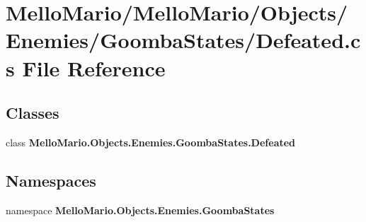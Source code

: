 \section{Mello\+Mario/\+Mello\+Mario/\+Objects/\+Enemies/\+Goomba\+States/\+Defeated.cs File Reference}
\label{GoombaStates_2Defeated_8cs}
\subsection*{Classes}
\begin{DoxyCompactItemize}
\item 
class \textbf{ Mello\+Mario.\+Objects.\+Enemies.\+Goomba\+States.\+Defeated}
\end{DoxyCompactItemize}
\subsection*{Namespaces}
\begin{DoxyCompactItemize}
\item 
namespace \textbf{ Mello\+Mario.\+Objects.\+Enemies.\+Goomba\+States}
\end{DoxyCompactItemize}

